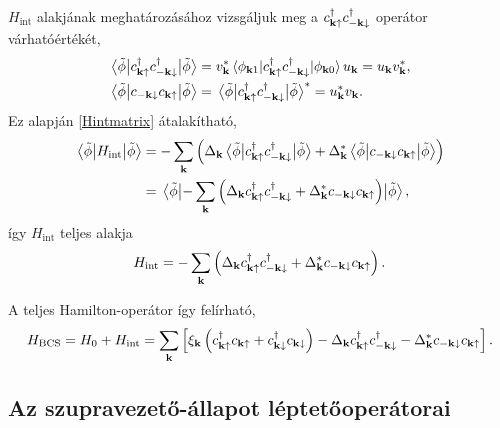 \documentclass[a4paper,12pt,titlepage]{article}
\newcommand{\KK}{{\vb{k}}}
\begin{document}
$H_\text{int}$ alakjának meghatározásához vizsgáljuk meg a $c_{\KK \uparrow}^\dagger c_{-\KK \downarrow}^\dagger$ operátor várhatóértékét,
\begin{equation}
\begin{split}
	\matrixelement{\tilde{\phi}}{c_{\KK \uparrow}^\dagger c_{-\KK \downarrow}^\dagger}{\tilde{\phi}} & = v_\KK^* \matrixelement{\phi_{\KK 1}}{c_{\KK \uparrow}^\dagger c_{-\KK \downarrow}^\dagger}{\phi_{\KK 0}} u_\KK = u_\KK v_\KK^*, \\
	\matrixelement{\tilde{\phi}}{c_{-\KK \downarrow} c_{\KK \uparrow}}{\tilde{\phi}} & = \matrixelement{\tilde{\phi}}{c_{\KK \uparrow}^\dagger c_{-\KK \downarrow}^\dagger}{\tilde{\phi}}^* = u_\KK^* v_\KK.
\end{split}
\end{equation}
Ez alapján \eqref{Hintmatrix} átalakítható,
\begin{equation}
\begin{split}
	\matrixelement{\tilde{\phi}}{H_\text{int}}{\tilde{\phi}} & = - \sum\limits_\KK \left( \Delta_\KK \matrixelement{\tilde{\phi}}{c_{\KK \uparrow}^\dagger c_{-\KK \downarrow}^\dagger}{\tilde{\phi}} + \Delta_\KK^* \matrixelement{\tilde{\phi}}{c_{-\KK \downarrow} c_{\KK \uparrow}}{\tilde{\phi}} \right) \\
	& = \matrixelement{\tilde{\phi}}{- \sum\limits_\KK \left( \Delta_\KK c_{\KK \uparrow}^\dagger c_{-\KK \downarrow}^\dagger + \Delta_\KK^* c_{-\KK \downarrow} c_{\KK \uparrow} \right)}{\tilde{\phi}},
\end{split}
\end{equation}
így $H_\text{int}$ teljes alakja
\begin{equation}
	H_\text{int} = - \sum\limits_\KK \left( \Delta_\KK c_{\KK \uparrow}^\dagger c_{-\KK \downarrow}^\dagger + \Delta_\KK^* c_{-\KK \downarrow} c_{\KK \uparrow} \right).
\end{equation}

A teljes Hamilton-operátor így felírható,
\begin{equation}
	H_\text{BCS} = H_0 + H_\text{int} = \sum\limits_\KK \left[ \xi_\KK \left( c_{\KK \uparrow}^\dagger c_{\KK \uparrow} + c_{\KK \downarrow}^\dagger c_{\KK \downarrow} \right) - \Delta_\KK c_{\KK \uparrow}^\dagger c_{-\KK \downarrow}^\dagger - \Delta_\KK^* c_{-\KK \downarrow} c_{\KK \uparrow} \right].
\end{equation}


\subsection{Az szupravezető-állapot léptetőoperátorai}
\end{document}
